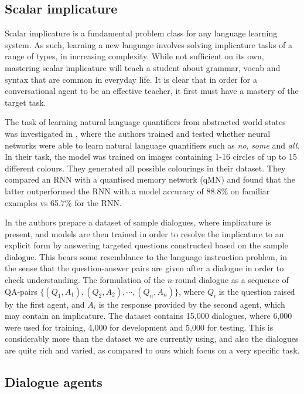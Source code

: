 \subsection{Scalar implicature}

Scalar implicature \cite{grice1975logic} is a fundamental problem class for any language learning system. As such, learning a new language involves solving implicature tasks of a range of types, in increasing complexity. While not sufficient on its own, mastering scalar implicature will teach a student about grammar, vocab and syntax that are common in everyday life. It is clear that in order for a conversational agent to be an effective teacher, it first must have a mastery of the target task.

The task of learning natural language quantifiers from abstracted world states was investigated in \cite{sorodoc2016look}, where the authors trained and tested whether neural networks were able to learn natural language quantifiers such as \textit{no}, \textit{some} and \textit{all}. In their task, the model was trained on images containing 1-16 circles of up to 15 different colours. They generated all possible colourings in their dataset. They compared an RNN with a quantised memory network (qMN) and found that the latter outperformed the RNN with a model accuracy of 88.8\% on familiar examples vs 65.7\% for the RNN.

In \cite{zheng2021grice} the authors prepare a dataset of sample dialogues, where implicature is present, and models are then trained in order to resolve the implicature to an explicit form by answering targeted questions constructed based on the sample dialogue. This bears some resemblance to the language instruction problem, in the sense that the question-answer pairs are given after a dialogue in order to check understanding. The formulation of the $n$-round dialogue as a sequence of QA-pairs $\{(Q_1, A_1), (Q_2, A_2), \cdots, (Q_n, A_n)\}$, where $Q_i$ is the question raised by the first agent, and $A_i$ is the response provided by the second agent, which may contain an implicature. The dataset contains 15,000 dialogues, where 6,000 were used for training, 4,000 for development and 5,000 for testing. This is considerably more than the dataset we are currently using, and also the dialogues are quite rich and varied, as compared to ours which focus on a very specific task.

\subsection{Dialogue agents}

